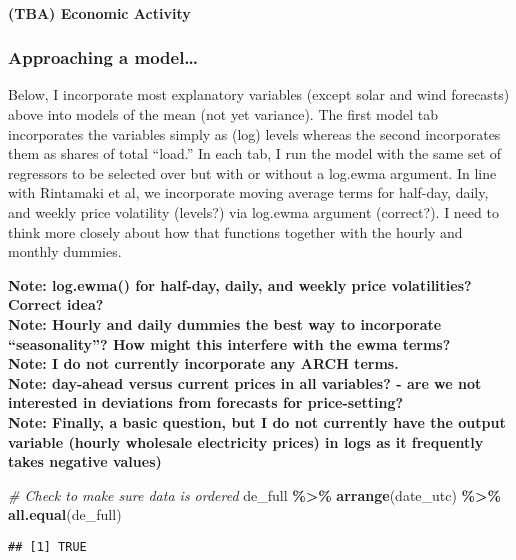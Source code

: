 \documentclass[
]{article}
\newenvironment{Shaded}{\begin{snugshade}}{\end{snugshade}}
\newcommand{\CommentTok}[1]{\textcolor[rgb]{0.56,0.35,0.01}{\textit{#1}}}
\newcommand{\FunctionTok}[1]{\textcolor[rgb]{0.13,0.29,0.53}{\textbf{#1}}}
\newcommand{\NormalTok}[1]{#1}
\newcommand{\SpecialCharTok}[1]{\textcolor[rgb]{0.81,0.36,0.00}{\textbf{#1}}}
\begin{document}
\paragraph{(TBA) Economic Activity}\label{tba-economic-activity}

\subsubsection{\texorpdfstring{\textbf{Approaching a
model\ldots{}}}{Approaching a model\ldots{}}}\label{approaching-a-model}

Below, I incorporate most explanatory variables (except solar and wind
forecasts) above into models of the mean (not yet variance). The first
model tab incorporates the variables simply as (log) levels whereas the
second incorporates them as shares of total ``load.'' In each tab, I run
the model with the same set of regressors to be selected over but with
or without a log.ewma argument. In line with Rintamaki et al, we
incorporate moving average terms for half-day, daily, and weekly price
volatility (levels?) via log.ewma argument (correct?). I need to think
more closely about how that functions together with the hourly and
monthly dummies.

\textbf{Note: log.ewma() for half-day, daily, and weekly price
volatilities? Correct idea?}\\
\textbf{Note: Hourly and daily dummies the best way to incorporate
``seasonality''? How might this interfere with the ewma terms?}\\
\textbf{Note: I do not currently incorporate any ARCH terms.}\\
\textbf{Note: day-ahead versus current prices in all variables? - are we
not interested in deviations from forecasts for price-setting?}\\
\textbf{Note: Finally, a basic question, but I do not currently have the
output variable (hourly wholesale electricity prices) in logs as it
frequently takes negative values)}

\begin{Shaded}
\begin{Highlighting}[]
\CommentTok{\# Check to make sure data is ordered}
\NormalTok{de\_full }\SpecialCharTok{\%\textgreater{}\%} \FunctionTok{arrange}\NormalTok{(date\_utc) }\SpecialCharTok{\%\textgreater{}\%} \FunctionTok{all.equal}\NormalTok{(de\_full)}
\end{Highlighting}
\end{Shaded}

\begin{verbatim}
## [1] TRUE
\end{verbatim}
\end{document}
